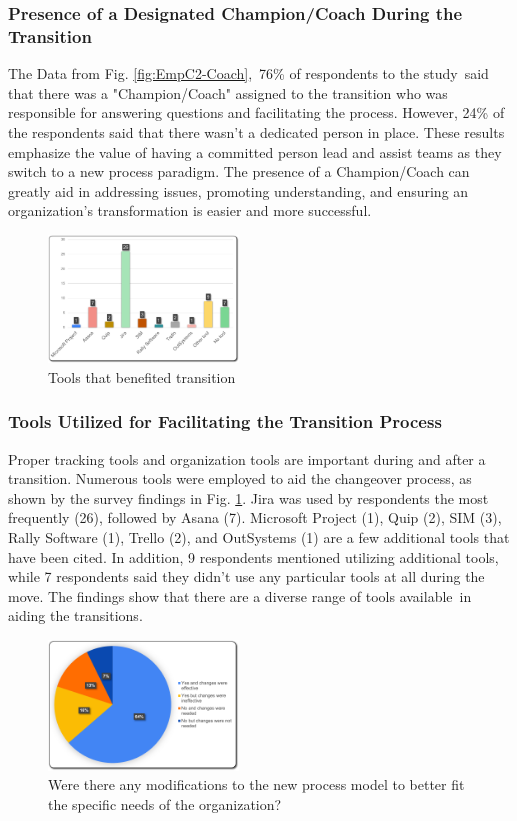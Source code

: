 \documentclass[conference]{IEEEtran}
\begin{document}
\subsubsection{Presence of a Designated Champion/Coach During the Transition}
The Data from Fig. \ref{fig:EmpC2-Coach}, 76\% of respondents to the study said that there was a "Champion/Coach" assigned to the transition who was responsible for answering questions and facilitating the process. However, 24\% of the respondents said that there wasn't a dedicated person in place. These results emphasize the value of having a committed person lead and assist teams as they switch to a new process paradigm. The presence of a Champion/Coach can greatly aid in addressing issues, promoting understanding, and ensuring an organization's transformation is easier and more successful\cite{8672701, 9137917}.
\begin{figure}[H]
    \centering
    \includegraphics[width=0.45\textwidth]{images/EmpC3-Tools}
    \caption{Tools that benefited transition}
    \label{fig:EmpC3-Tools}
\end{figure}
\subsubsection{Tools Utilized for Facilitating the Transition Process}
Proper tracking tools and organization tools are important during and after a transition\cite{9522254}. Numerous tools were employed to aid the changeover process, as shown by the survey findings in Fig. \ref{fig:EmpC3-Tools}. Jira was used by respondents the most frequently (26), followed by Asana (7). Microsoft Project (1), Quip (2), SIM (3), Rally Software (1), Trello (2), and OutSystems (1) are a few additional tools that have been cited. In addition, 9 respondents mentioned utilizing additional tools, while 7 respondents said they didn't use any particular tools at all during the move. The findings show that there are a diverse range of tools available in aiding the transitions.
\begin{figure}[H]
    \centering
    \includegraphics[width=0.45\textwidth]{images/EmpC4-Modifications}
    \caption{Were there any modifications to the new process model to better fit the specific needs of the organization?}
    \label{fig:EmpC4-Modification}
\end{figure}
\end{document}

